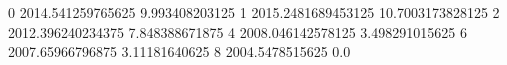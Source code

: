 0 2014.541259765625 9.993408203125
1 2015.2481689453125 10.7003173828125
2 2012.396240234375 7.848388671875
4 2008.046142578125 3.498291015625
6 2007.65966796875 3.11181640625
8 2004.5478515625 0.0
